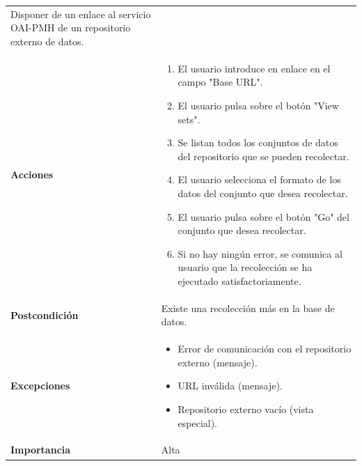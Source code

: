 \documentclass[
]{article}
\providecommand{\tightlist}{%
  \setlength{\itemsep}{0pt}\setlength{\parskip}{0pt}}
\begin{document}
\begin{longtable}[]{@{}ll@{}}
\begin{minipage}[t]{0.76\columnwidth}
Disponer de un enlace al servicio OAI-PMH de un repositorio externo de
datos.\strut
\end{minipage}\tabularnewline
\begin{minipage}[t]{0.18\columnwidth}\raggedright
\textbf{Acciones}\strut
\end{minipage} & \begin{minipage}[t]{0.76\columnwidth}\raggedright
\begin{enumerate}
\def\labelenumi{\arabic{enumi}.}
\tightlist
\item
  El usuario introduce en enlace en el campo "Base URL".
\item
  El usuario pulsa sobre el botón "View sets".
\item
  Se listan todos los conjuntos de datos del repositorio que se pueden
  recolectar.
\item
  El usuario selecciona el formato de los datos del conjunto que desea
  recolectar.
\item
  El usuario pulsa sobre el botón "Go" del conjunto que desea
  recolectar.
\item
  Si no hay ningún error, se comunica al usuario que la recolección se
  ha ejecutado satisfactoriamente.
\end{enumerate}\strut
\end{minipage}\tabularnewline
\begin{minipage}[t]{0.18\columnwidth}\raggedright
\textbf{Postcondición}\strut
\end{minipage} & \begin{minipage}[t]{0.76\columnwidth}\raggedright
Existe una recolección más en la base de datos.\strut
\end{minipage}\tabularnewline
\begin{minipage}[t]{0.18\columnwidth}\raggedright
\textbf{Excepciones}\strut
\end{minipage} & \begin{minipage}[t]{0.76\columnwidth}\raggedright
\begin{itemize}
\tightlist
\item
  Error de comunicación con el repositorio externo (mensaje).
\item
  URL inválida (mensaje).
\item
  Repositorio externo vacío (vista especial).
\end{itemize}\strut
\end{minipage}\tabularnewline
\begin{minipage}[t]{0.18\columnwidth}\raggedright
\textbf{Importancia}\strut
\end{minipage} & \begin{minipage}[t]{0.76\columnwidth}\raggedright
Alta\strut
\end{minipage}\tabularnewline
\bottomrule
\end{longtable}
\end{document}
